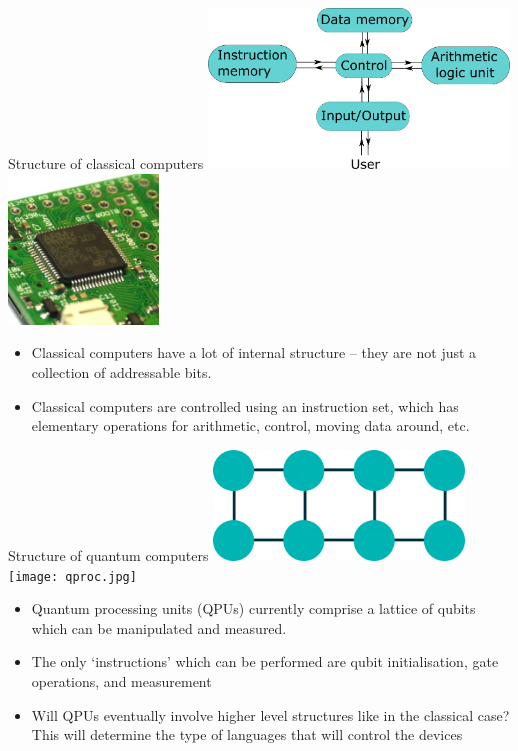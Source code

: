 \documentclass{beamer}
\begin{document}
\begin{frame}{Structure of classical computers}
  \includegraphics[width=0.6\textwidth]{Harvard_architecture.png}
  \hfill
  \includegraphics[width=0.3\textwidth]{micro.jpg}
  \begin{itemize}
  \item Classical computers have a lot of internal structure -- they are not just a collection of addressable bits.
  \item Classical computers are controlled using an instruction set, which has elementary operations for arithmetic, control, moving data around, etc.
  \end{itemize}
\end{frame}

\begin{frame}{Structure of quantum computers}
  \includegraphics[width=0.5\textwidth]{nearestneighbourcon.png}
  \hfill
  \texttt{[image: qproc.jpg]}
  \begin{itemize}
  \item Quantum processing units (QPUs) currently comprise a lattice of qubits which can be manipulated and measured.
  \item The only `instructions' which can be performed are qubit initialisation, gate operations, and measurement
  \item Will QPUs eventually involve higher level structures like in the classical case? This will determine the type of languages that will control the devices
  \end{itemize}
\end{frame}
\end{document}
